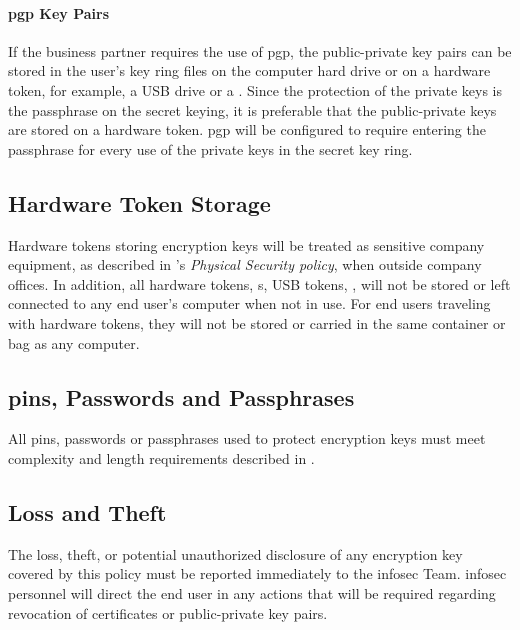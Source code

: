 \paragraph{\gls{pgp} Key Pairs}
If the business partner requires the use of \gls{pgp}, the public-private key pairs can be stored in the user's key ring files on the computer hard drive or on a hardware token, for example, a USB drive or a \smartcard{}.  
Since the protection of the private keys is the passphrase on the secret keying, it is preferable that the public-private keys are stored on a hardware token.  
\gls{pgp} will be configured to require entering the passphrase for every use of the private keys in the secret key ring.
\subsection{Hardware Token Storage}
Hardware tokens storing encryption keys will be treated as sensitive company equipment, as described in \CompanyName{}'s \textsl{Physical Security policy}, when outside company offices.  %
In addition, all hardware tokens, \smartcard{}s, USB tokens, \etc, will not be stored or left connected to any end user's computer when not in use.  
For end users traveling with hardware tokens, they will not be stored or carried in the same container or bag as any computer.
\subsection{\gls{pin}s, Passwords\oxford{} and Passphrases}
All \gls{pin}s, passwords\oxford{} or passphrases used to protect encryption keys must meet complexity and length requirements described in .
\subsection{Loss and Theft}
The loss, theft, or potential unauthorized disclosure of any encryption key covered by this policy must be reported immediately to the \gls{infosec} Team.  
\gls{infosec} personnel will direct the end user in any actions that will be required regarding revocation of certificates or public-private key pairs.
\CommonPolicyCompliance
